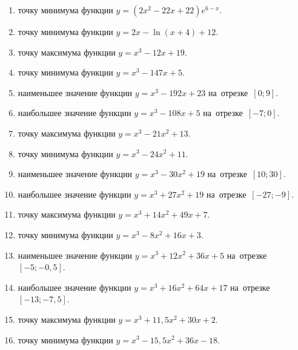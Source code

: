 \documentclass[a4paper,10pt]{article}
\begin{document}
\begin{enumerate}
\item {} точку минимума функции $y=\left(2x^2-22x+22\right){{e}^{6-x}}$.

\item {} точку минимума функции $y=2x-\ln \left(x+4\right)+12$.

\item {} точку максимума функции $y=x^3 -12x +19$.

\item {} точку минимума функции $y=x^3 -147x+5$.

\item {} наименьшее значение функции $y=x^3 -192x+23$ на~отрезке~$\left[0;9\right]$.

\item {} наибольшее значение функции $y=x^3 -108x+5$ на~отрезке~$\left[-7;0\right]$.

\item {} точку максимума функции $y=x^3 -21x^2+13$.

\item {} точку минимума функции $y=x^3 -24x^2+11$.

\item {} наименьшее значение функции $y=x^3 -30x^2+19$ на~отрезке~$\left[10;30\right]$.

\item {} наибольшее значение функции $y=x^3 +27x^2+19$ на~отрезке~$\left[-27;-9\right]$.

\item {} точку максимума функции $y=x^3 +14x^2+49x+7$.

\item {} точку минимума функции $y=x^3 -8x^2+16x+3$.

\item {} наименьшее значение функции $y=x^3 +12x^2+36x+5$ на~отрезке~$\left[-5;-0,5\right]$.

\item {} наибольшее значение функции $y=x^3 +16x^2+64x+17$ на~отрезке~$\left[-13;-7,5\right]$.

\item {} точку максимума функции $y=x^3 +11,5x^2+30x+2$.

\item {} точку минимума функции $y=x^3 -15,5x^2+36x-18$.


\end{enumerate}
\end{document}
